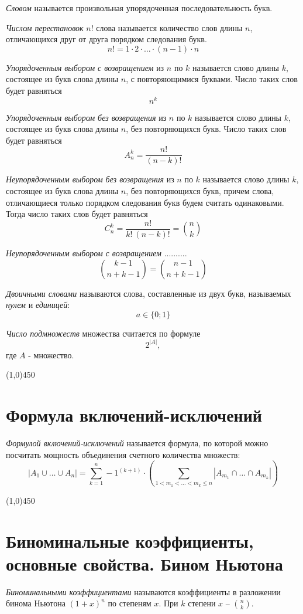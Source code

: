 \documentclass[a4paper,12pt]{article}
\begin{document}
	\textit{Словом} называется произвольная упорядоченная последовательность букв.

	\textit{Числом перестановок} $n!$ слова называется количество слов длины $n$, отличающихся друг от друга порядком следования букв.
	\[
	n! = 1 \cdot 2 \cdot \ldots \cdot (n - 1) \cdot n
	\]

	\textit{Упорядоченным выбором с возвращением} из $n$ по $k$ называется слово длины $k$, состоящее из букв слова длины $n$, с повторяющимися буквами. Число таких слов будет равняться
	\[
	n^k
	\]

	\textit{Упорядоченным выбором без возвращения} из $n$ по $k$ называется слово длины $k$, состоящее из букв слова длины $n$, без повторяющихся букв. Число таких слов будет равняться
	\[
	A_n^k = \frac{n!}{(n - k)!}
	\]

	\textit{Неупорядоченным выбором без возвращения} из $n$ по $k$ называется слово длины $k$, состоящее из букв слова длины $n$, без повторяющихся букв, причем слова, отличающиеся только порядком следования букв будем считать одинаковыми. Тогда число таких слов будет равняться
	\[
	C_n^k = \frac{n!}{k! \ (n - k)!} = {n \choose k}
	\]

	\textit{Неупорядоченным выбором с возвращением} ..........
	\[
	{k - 1 \choose n + k - 1} = {n - 1 \choose n + k - 1}
	\]

	\textit{Двоичными словами} называются слова, составленные из двух букв, называемых \textit{нулем} и \textit{единицей}:
	\[
	a \in \{0; 1\}
	\]


	\textit{Число подмножеств} множества считается по формуле
	\[
	2 ^ {|A|},
	\]
	где $A$ - множество.
	\begin{center}
		\line(1,0){450}
	\end{center}

	\section*{Формула включений-исключений}
	\textit{Формулой включений-исключений} называется формула, по которой можно посчитать мощность объединения счетного количества множеств:
	\[
	|A_1 \cup \ldots \cup A_n| = \sum_{k = 1}^{n} -1^{(k + 1)} \cdot (\sum_{1 < m_1 < \ldots <m_k \leq n} |A_{m_1} \cap \ldots \cap A_{m_k}|)
	\]

	\begin{center}
		\line(1,0){450}
	\end{center}

	\section*{Биноминальные коэффициенты, основные свойства. Бином Ньютона}
	\textit{Биноминальными коэффициентами} называются коэффициенты в разложении бинома Ньютона $(1 + x)^n$ по степеням $x$. При $k$ степени $x$ -- ${n \choose k}$.
\end{document}
